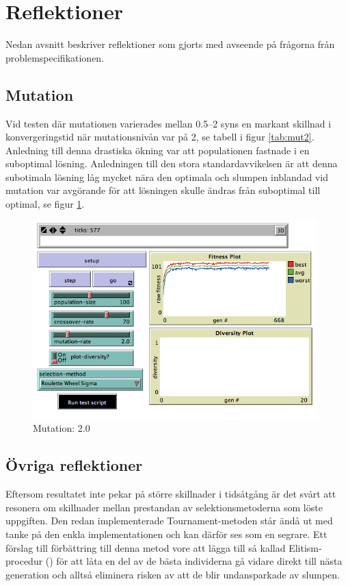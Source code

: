 \documentclass[titlepage, a4paper, 12pt]{article}
\begin{document}
\section{Reflektioner}\label{sec:reflektioner}
Nedan avsnitt beskriver reflektioner som gjorts med avseende på
frågorna från problemspecifikationen.

\subsection{Mutation}
Vid testen där mutationen varierades mellan 0.5–2 syns en markant
skillnad i konvergeringstid när mutationsnivån var på 2, se tabell i
figur \ref{tab:mut2}. Anledning till denna drastiska ökning var att
populationen fastnade i en suboptimal lösning. Anledningen till den
stora standardavvikelsen är att denna subotimala lösning låg mycket
nära den optimala och slumpen inblandad vid mutation var avgörande för
att lösningen skulle ändras från suboptimal till optimal, se figur
\ref{fig:images/Roulette-Wheel-Sigma-100-70-2-20}.

\begin{figure}[H]
  \begin{center}
    \includegraphics[width=110mm]{images/Roulette-Wheel-Sigma-100-70-2-20.png}
    \caption{Mutation: 2.0}
    \label{fig:images/Roulette-Wheel-Sigma-100-70-2-20}
  \end{center}
\end{figure}

\subsection{Övriga reflektioner}
Eftersom resultatet inte pekar på större skillnader i tidsåtgång är
det svårt att resonera om skillnader mellan prestandan av
selektionsmetoderna som löste uppgiften. Den redan implementerade
Tournament-metoden står ändå ut med tanke på den enkla
implementationen och kan därför ses som en segrare. Ett förslag till
förbättring till denna metod vore att lägga till så kallad
Elitism-procedur (\cite{gen-intro}) för att låta en del av de bästa
individerna gå vidare direkt till nästa generation och alltså
eliminera risken av att de blir undansparkade av slumpen.
    
\end{document}
